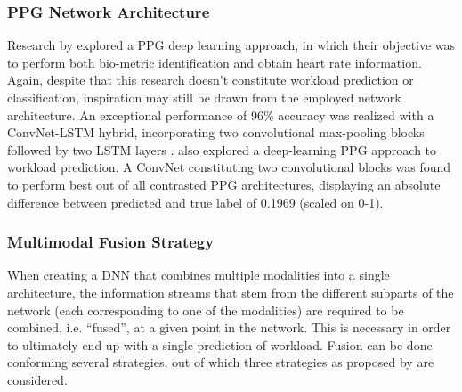 \documentclass[fleqn,11pt]{paper}
\begin{document}
\subsubsection*{PPG Network Architecture}
Research by  explored a PPG deep learning approach, in which their objective was to perform both bio-metric identification and obtain heart rate information. Again, despite that this research doesn't constitute workload prediction or classification, inspiration may still be drawn from the employed network architecture. An exceptional performance of 96\% accuracy was realized with a ConvNet-LSTM hybrid, incorporating two convolutional max-pooling blocks followed by two LSTM layers \cite{biswas2019cornet}.  also explored a deep-learning PPG approach to workload prediction.  A ConvNet constituting two convolutional blocks was found to perform best out of all contrasted PPG architectures, displaying an absolute difference between predicted and true label of 0.1969 (scaled on 0-1).

\subsubsection*{Multimodal Fusion Strategy}  
When creating a DNN that combines multiple modalities into a single architecture,  the information streams that stem from the different subparts of the network (each corresponding to one of the modalities) are required to be combined, i.e. \enquote{fused}, at a given point in the network. This is necessary in order to ultimately end up with a single prediction of workload. Fusion can be done conforming several strategies, out of which three strategies as proposed by  are considered.
\end{document}
